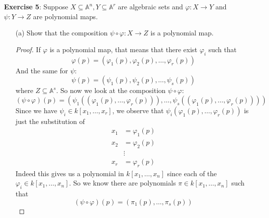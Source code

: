 \documentclass{article}
\begin{document}
\textbf{Exercise 5}: Suppose $X \subseteq \mathbb{A}^{n}, Y \subseteq \mathbb{A}^{r}$ are algebraic sets and $\varphi : X \rightarrow Y$ and $\psi : Y \rightarrow Z$ are polynomial maps. 
    \begin{itemize}
        \item [(a)] Show that the composition $\psi \circ \varphi : X \rightarrow Z$ is a polynomial map.
            \begin{proof}
                If $\varphi$ is a polynomial map, that means that there exist $\varphi_{i}$ such that
                    \begin{equation*}
                        \varphi(p) = (\varphi_{1}(p), \varphi_{2}(p), \ldots , \varphi_{r}(p))
                    \end{equation*}
                And the same for $\psi$:
                    \begin{equation*}
                        \psi(p) = (\psi_{1}(p), \psi_{2}(p), \ldots , \psi_{s}(p))
                    \end{equation*}
                where $Z \subseteq \mathbb{A}^{s}$. So now we look at the composition $\psi \circ \varphi$:
                    \begin{equation*}
                        (\psi \circ \varphi)(p) = (\psi_{1}((\varphi_{1}(p), \ldots , \varphi_{r}(p))), \ldots, \psi_{s}((\varphi_{1}(p), \ldots , \varphi_{r}(p))))
                    \end{equation*}
                Since we have $\psi_{i} \in k[x_{1}, \ldots , x_{r}]$, we observe that $\psi_{i}(\varphi_{1}(p), \ldots , \varphi_{r}(p))$ is just the substitution of
                    \begin{align*}
                        x_{1} &=       \varphi_{1}(p) \\
                        x_{2} &=       \varphi_{2}(p) \\
                              &\vdots                 \\
                        x_{r} &=       \varphi_{r}(p)   
                    \end{align*}
                Indeed this gives us a polynomial in $k[x_{1}, \ldots , x_{n}]$ since each of the $\varphi_{i} \in k[x_{1}, \ldots , x_{n}]$. So we know there are polynomials $\pi \in k[x_{1}, \ldots , x_{n}]$ such that
                    \begin{equation*}
                        (\psi \circ \varphi)(p) = (\pi_{1}(p), \ldots , \pi_{s}(p))
                    \end{equation*}
            \end{proof}


\end{itemize}
\end{document}
